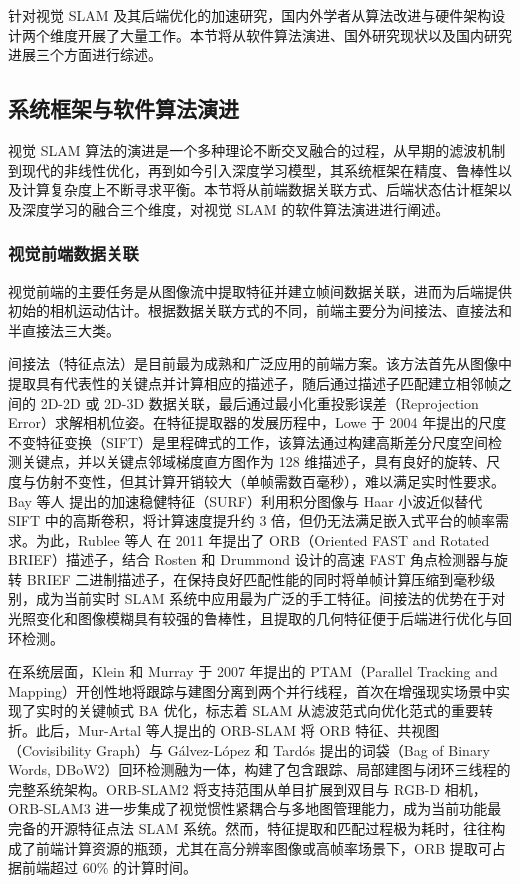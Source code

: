 针对视觉 SLAM 及其后端优化的加速研究，国内外学者从算法改进与硬件架构设计两个维度开展了大量工作。本节将从软件算法演进、国外研究现状以及国内研究进展三个方面进行综述。

\subsection{系统框架与软件算法演进}

视觉 SLAM 算法的演进是一个多种理论不断交叉融合的过程，从早期的滤波机制到现代的非线性优化，再到如今引入深度学习模型，其系统框架在精度、鲁棒性以及计算复杂度上不断寻求平衡。本节将从前端数据关联方式、后端状态估计框架以及深度学习的融合三个维度，对视觉 SLAM 的软件算法演进进行阐述。

\subsubsection{视觉前端数据关联}

视觉前端的主要任务是从图像流中提取特征并建立帧间数据关联，进而为后端提供初始的相机运动估计。根据数据关联方式的不同，前端主要分为间接法、直接法和半直接法三大类。

间接法（特征点法）是目前最为成熟和广泛应用的前端方案。该方法首先从图像中提取具有代表性的关键点并计算相应的描述子，随后通过描述子匹配建立相邻帧之间的 2D-2D 或 2D-3D 数据关联，最后通过最小化重投影误差（Reprojection Error）求解相机位姿。在特征提取器的发展历程中，Lowe\cite{lowe2004distinctive} 于 2004 年提出的尺度不变特征变换（SIFT）是里程碑式的工作，该算法通过构建高斯差分尺度空间检测关键点，并以关键点邻域梯度直方图作为 128 维描述子，具有良好的旋转、尺度与仿射不变性，但其计算开销较大（单帧需数百毫秒），难以满足实时性要求。Bay 等人\cite{bay2008surf} 提出的加速稳健特征（SURF）利用积分图像与 Haar 小波近似替代 SIFT 中的高斯卷积，将计算速度提升约 3 倍，但仍无法满足嵌入式平台的帧率需求。为此，Rublee 等人\cite{rublee2011orb} 在 2011 年提出了 ORB（Oriented FAST and Rotated BRIEF）描述子，结合 Rosten 和 Drummond\cite{rosten2006machine} 设计的高速 FAST 角点检测器与旋转 BRIEF 二进制描述子，在保持良好匹配性能的同时将单帧计算压缩到毫秒级别，成为当前实时 SLAM 系统中应用最为广泛的手工特征。间接法的优势在于对光照变化和图像模糊具有较强的鲁棒性，且提取的几何特征便于后端进行优化与回环检测。

在系统层面，Klein 和 Murray\cite{klein2007parallel} 于 2007 年提出的 PTAM（Parallel Tracking and Mapping）开创性地将跟踪与建图分离到两个并行线程，首次在增强现实场景中实现了实时的关键帧式 BA 优化，标志着 SLAM 从滤波范式向优化范式的重要转折。此后，Mur-Artal 等人\cite{mur2015orb}提出的 ORB-SLAM 将 ORB 特征、共视图（Covisibility Graph）与 G{\'a}lvez-L{\'o}pez 和 Tard{\'o}s\cite{galvez2012bags} 提出的词袋（Bag of Binary Words, DBoW2）回环检测融为一体，构建了包含跟踪、局部建图与闭环三线程的完整系统架构。ORB-SLAM2\cite{mur2017orb} 将支持范围从单目扩展到双目与 RGB-D 相机，ORB-SLAM3\cite{campos2021orb} 进一步集成了视觉惯性紧耦合与多地图管理能力，成为当前功能最完备的开源特征点法 SLAM 系统。然而，特征提取和匹配过程极为耗时，往往构成了前端计算资源的瓶颈，尤其在高分辨率图像或高帧率场景下，ORB 提取可占据前端超过 60\% 的计算时间。

